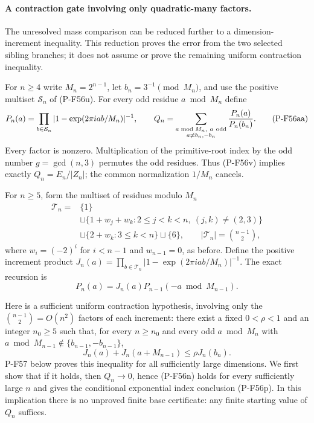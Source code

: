 \paragraph{A contraction gate involving only quadratic-many factors.}
The unresolved mass comparison can be reduced further to a
dimension-increment inequality. This reduction proves the error
from the two selected sibling branches; it does not assume or
prove the remaining uniform contraction inequality.

For $n\ge4$ write $M_n=2^{n-1}$, let
$b_n=3^{-1}\pmod {M_n}$, and use the positive multiset
$\mathcal S_n$ of (P-F56u). For every odd residue $a\bmod M_n$
define
\[
 P_n(a)=
 \prod_{b\in\mathcal S_n}
       |1-\exp(2\pi iab/M_n)|^{-1},\qquad
 Q_n=\sum_{\substack{a\bmod M_n,\ a\ {\rm odd}\\
                               a\ne b_n,-b_n}}
                              \frac{P_n(a)}{P_n(b_n)}.
 \tag{P-F56aa}
\]
Every factor is nonzero. Multiplication of the primitive-root
index by the odd number $g=\gcd(n,3)$ permutes the odd residues.
Thus (P-F56v) implies exactly $Q_n=E_n/|Z_n|$; the common
normalization $1/M_n$ cancels.

For $n\ge5$, form the multiset of residues modulo $M_n$
\[
 \begin{split}
 \mathcal T_n={}&\{1\}\\
 &\sqcup\{1+w_j+w_k:2\le j<k<n,\ (j,k)\ne(2,3)\}\\
 &\sqcup\{2+w_k:3\le k<n\}\sqcup\{6\},
 \qquad |\mathcal T_n|=\binom{n-1}2,
 \end{split}
 \tag{P-F56ab}
\]
where $w_i=(-2)^i$ for $i<n-1$ and $w_{n-1}=0$,
as before. Define the positive increment product
$J_n(a)=\prod_{b\in\mathcal T_n}
 |1-\exp(2\pi iab/M_n)|^{-1}$.
The exact recursion is
\[
             P_n(a)=J_n(a)P_{n-1}(-a\bmod M_{n-1}).
 \tag{P-F56ac}
\]

Here is a sufficient uniform contraction hypothesis, involving
only the $\binom{n-1}2=O(n^2)$ factors of each increment:
there exist a fixed $0<\rho<1$ and an integer $n_0\ge5$ such that,
for every $n\ge n_0$ and every odd $a\bmod M_n$ with
$a\bmod M_{n-1}\notin\{b_{n-1},-b_{n-1}\}$,
\[
 J_n(a)+J_n(a+M_{n-1})\le \rho J_n(b_n).
 \tag{P-F56ad}
\]
P-F57 below proves this inequality for all sufficiently large
dimensions. We first show that if it holds, then
$Q_n\longrightarrow0$, hence (P-F56n) holds for every
sufficiently large $n$ and gives the conditional exponential
index conclusion (P-F56p).
In this implication there is no unproved finite base
certificate: any finite starting value of $Q_n$ suffices.

